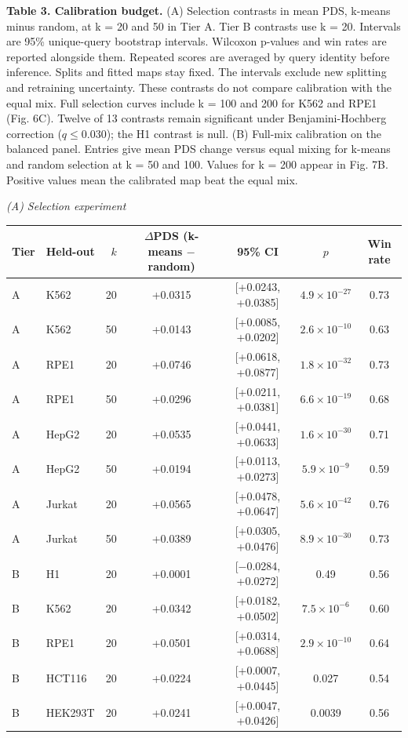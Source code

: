 \documentclass[12pt]{article}
\begin{document}
\begin{singlespace}
\noindent\textbf{Table 3. Calibration budget.} (A) Selection contrasts in mean PDS, k-means minus random, at k = 20 and 50 in Tier A. Tier B contrasts use k = 20. Intervals are 95\% unique-query bootstrap intervals. Wilcoxon p-values and win rates are reported alongside them. Repeated scores are averaged by query identity before inference. Splits and fitted maps stay fixed. The intervals exclude new splitting and retraining uncertainty. These contrasts do not compare calibration with the equal mix. Full selection curves include k = 100 and 200 for K562 and RPE1 (Fig. 6C). Twelve of 13 contrasts remain significant under Benjamini-Hochberg correction ($q \le 0.030$); the H1 contrast is null. (B) Full-mix calibration on the balanced panel. Entries give mean PDS change versus equal mixing for k-means and random selection at k = 50 and 100. Values for k = 200 appear in Fig. 7B. Positive values mean the calibrated map beat the equal mix.

\vspace{6pt}
\noindent\textit{(A) Selection experiment}

{\footnotesize
\setlength{\tabcolsep}{4pt}
\renewcommand{\arraystretch}{1.0}
\begin{tabular}{@{}llrcccc@{}}
\toprule
Tier & Held-out & $k$ & \makecell{$\Delta$PDS\\(k-means $-$ random)} & 95\% CI & $p$ & Win rate \\
\midrule
A & K562 & 20 & +0.0315 & [+0.0243, +0.0385] & $4.9 \times 10^{-27}$ & 0.73 \\
A & K562 & 50 & +0.0143 & [+0.0085, +0.0202] & $2.6 \times 10^{-10}$ & 0.63 \\
A & RPE1 & 20 & +0.0746 & [+0.0618, +0.0877] & $1.8 \times 10^{-32}$ & 0.73 \\
A & RPE1 & 50 & +0.0296 & [+0.0211, +0.0381] & $6.6 \times 10^{-19}$ & 0.68 \\
A & HepG2 & 20 & +0.0535 & [+0.0441, +0.0633] & $1.6 \times 10^{-30}$ & 0.71 \\
A & HepG2 & 50 & +0.0194 & [+0.0113, +0.0273] & $5.9 \times 10^{-9}$ & 0.59 \\
A & Jurkat & 20 & +0.0565 & [+0.0478, +0.0647] & $5.6 \times 10^{-42}$ & 0.76 \\
A & Jurkat & 50 & +0.0389 & [+0.0305, +0.0476] & $8.9 \times 10^{-30}$ & 0.73 \\
B & H1 & 20 & +0.0001 & [$-$0.0284, +0.0272] & 0.49 & 0.56 \\
B & K562 & 20 & +0.0342 & [+0.0182, +0.0502] & $7.5 \times 10^{-6}$ & 0.60 \\
B & RPE1 & 20 & +0.0501 & [+0.0314, +0.0688] & $2.9 \times 10^{-10}$ & 0.64 \\
B & HCT116 & 20 & +0.0224 & [+0.0007, +0.0445] & 0.027 & 0.54 \\
B & HEK293T & 20 & +0.0241 & [+0.0047, +0.0426] & 0.0039 & 0.56 \\
\bottomrule
\end{tabular}
}


\end{singlespace}
\end{document}
